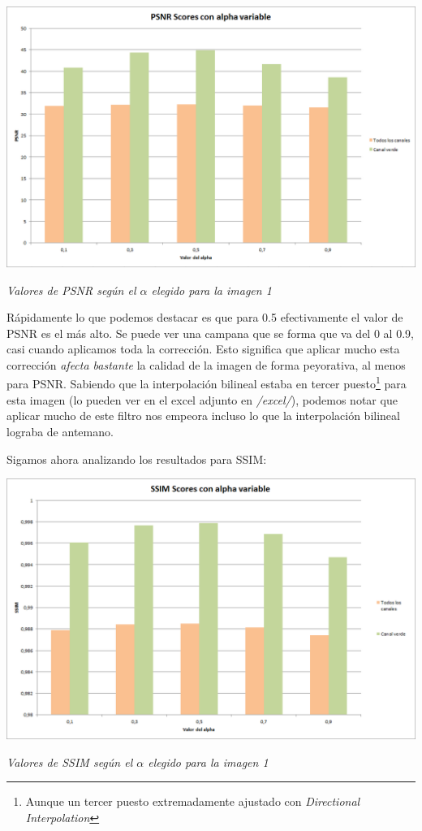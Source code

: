 	\begin{center}
		\includegraphics[scale=.3]{img/psnrScoresALPHA.png}
		\vspace{2pt}
		\par
		\footnotesize\textit{Valores de PSNR según el $\alpha$ elegido para la imagen 1}
	\end{center}


Rápidamente lo que podemos destacar es que para 0.5 efectivamente el valor de PSNR es el más alto. Se puede ver una campana que se forma que va del 0 al 0.9, casi cuando aplicamos toda la corrección. Esto significa que aplicar mucho esta corrección \textit{afecta bastante} la calidad de la imagen de forma peyorativa, al menos para PSNR. Sabiendo que la interpolación bilineal estaba en tercer puesto\footnote{Aunque un tercer puesto extremadamente ajustado con \textit{Directional Interpolation}} para esta imagen (lo pueden ver en el excel adjunto en \textit{/excel/}), podemos notar que aplicar mucho de este filtro nos empeora incluso lo que la interpolación bilineal lograba de antemano.

\vspace{\baselineskip}

Sigamos ahora analizando los resultados para SSIM:


	\begin{center}
		\includegraphics[scale=.3]{img/ssimScoresALPHA.png}
		\vspace{2pt}
		\par
		\footnotesize\textit{Valores de SSIM según el $\alpha$ elegido para la imagen 1}
	\end{center}

